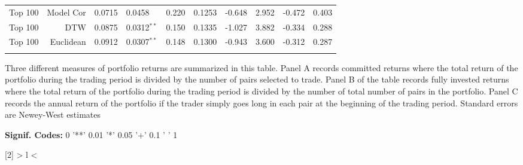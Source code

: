 \begin{table}[hp]
\begin{threeparttable}
\begin{tabular}{l r r l c c c c c c}
            Top 100   & Model Cor      & 0.0715 & 0.0458          & 0.220 & 0.1253 & -0.648 & 2.952 & -0.472 & 0.403 \\
            Top 100   & DTW            & 0.0875 & 0.0312{$^{**}$} & 0.150 & 0.1335 & -1.027 & 3.882 & -0.334 & 0.288 \\
            Top 100   & Euclidean      & 0.0912 & 0.0307{$^{**}$} & 0.148 & 0.1300 & -0.943 & 3.600 & -0.312 & 0.287 \\
            \vspace{-1mm} \\
            \hline
        \end{tabular}
        \begin{tablenotes}
            \item{\footnotesize Three different measures of portfolio returns are summarized in this table. Panel A records committed returns where the total return of the portfolio during the trading period is divided by the number of pairs selected to trade. Panel B of the table records fully invested returns where the total return of the portfolio during the trading period is divided by the number of total number of pairs in the portfolio. Panel C records the annual return of the portfolio if the trader simply goes long in each pair at the beginning of the trading period. Standard errors are Newey-West estimates}
            \item{\footnotesize \textbf{Signif. Codes:} 0 '**' 0.01 '*' 0.05 '+' 0.1 ' ' 1}
        \end{tablenotes}
    \end{threeparttable}
\end{table}


\newcolumntype{R}[2]{%
    >{\bgroup}%
    l%
    <{\egroup}%
}
\newcommand*\rot{\multicolumn{1}{R{30}{1em}}}%


